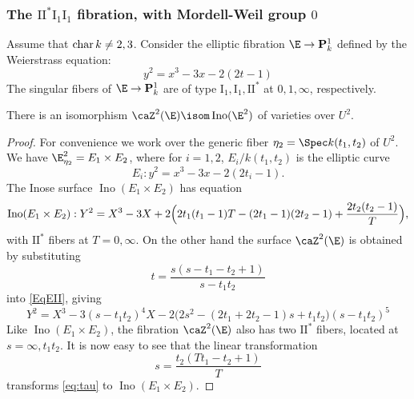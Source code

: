 \documentclass{article}
\DeclareMathOperator{\car}{{\rm char}}
\def\P{\mathbf{P}}
\newcommand{\Ino}{\operatorname{{Ino}}}
\newcommand{\II}{\mathrm{II}}
\newcommand{\I}{\mathrm{I}}
\begin{document}
\subsubsection{The $\II^*\I_1\I_1$ fibration, with Mordell-Weil group $0$}
\label{subsec:II*}
Assume that $\car k\neq 2,3$.  Consider the elliptic fibration $\E\to \P^1_k$ defined by the Weierstrass equation:
\begin{equation}
\label{EqEII}
y^{2}=x^3 - 3x - 2(2t - 1)
\end{equation}
The singular fibers of $\E\to\P^1_k$ are of type $\I_1,\I_1,\II^\ast$ at $0,1,\infty$, respectively.

\begin{prop} There is an isomorphism $\caZ^2(\E)\isom \Ino(\E^2)$ of varieties over $U^2$.
\end{prop}

\begin{proof}  For convenience we work over the generic fiber $\eta_2=\Spec k(t_1,t_2)$ of $U^2$.  We have $\E^2_{\eta_2}=E_1\times E_2$, where for $i=1,2$,  $E_i/k(t_1,t_2)$ is the elliptic curve
\[ E_i: y^2=x^3-3x-2(2t_i-1). \]
The Inose surface $\Ino(E_{1}\times E_{2})$ has equation
\[
\Ino(E_{1}\times E_{2}):
Y^2 = X^3 - 3X + 2 \Bigl( 2 t_{1} (t_{1} - 1) T 
- (2 t_{1} - 1) (2 t_{2} - 1) 
+ \frac{2 t_{2} (t_{2} - 1)}{T}\Bigr),
\]
with $\II^\ast$ fibers at $T=0,\infty$.
On the other hand the surface $\caZ^2(\E)$ is obtained by substituting 
%
%
\begin{equation}\label{eq:base-change-3}
t = \frac{s(s - t_{1} - t_{2} + 1)}{s - t_{1} t_{2}}
\end{equation}
into \eqref{EqEII}, giving
\begin{equation}
\label{eq:tau}
Y^{2} = X^3 - 3(s - t_{1} t_{2})^4 X 
-2\bigl(2s^2 - (2 t_{1} + 2 t_{2} - 1) s + t_{1} t_{2}\bigr) (s - t_{1} t_{2})^5
\end{equation}
Like $\Ino(E_1\times E_2)$, the fibration $\caZ^2(\E)$ also has two $\II^\ast$ fibers, located at $s=\infty,t_1t_2$. 
It is now easy to see that the linear transformation
\[
s =\frac{t_{2} (T t_{1} - t_{2} + 1)}{T}
\]
transforms \eqref{eq:tau} to $\Ino(E_{1}\times E_{2})$.
\end{proof}
\end{document}
